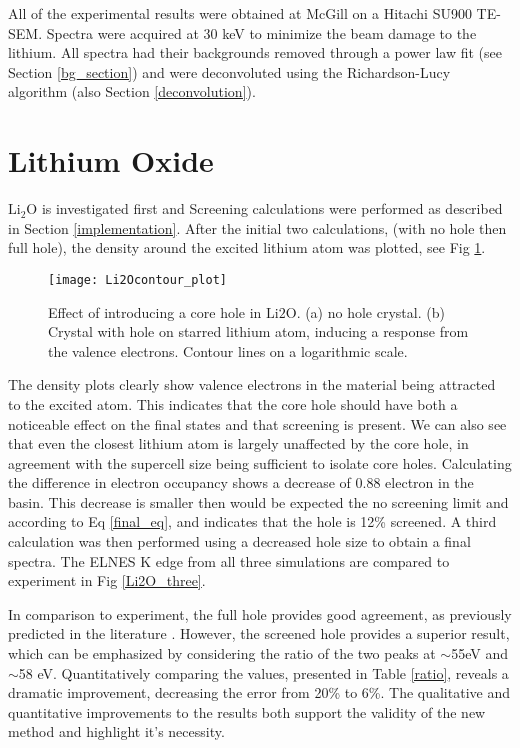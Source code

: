 All of the experimental results were obtained at McGill on a Hitachi SU900 TE-SEM.  Spectra were acquired at 30 keV to minimize the beam damage to the lithium.  All spectra had their backgrounds removed through a power law fit (see Section \ref{bg_section}) and were deconvoluted using the Richardson-Lucy algorithm (also Section \ref{deconvolution}).

\section{Lithium Oxide}

 $ \mathrm{Li_2O} $ is investigated first and Screening calculations were performed as described in Section \ref{implementation}.   After the initial two calculations, (with no hole then full hole), the density around the excited lithium atom was plotted, see Fig \ref{Li2O_contour}.  

\begin{figure}
	\centering
	\texttt{[image: Li2Ocontour\_plot]}
	\caption{Effect of introducing a core hole in $ \mathrm{Li2O} $.  (a) no hole crystal.  (b) Crystal with hole on starred lithium atom, inducing a response from the valence electrons.  Contour lines on a logarithmic scale. }
	\label{Li2O_contour}
\end{figure}

The density plots clearly show valence electrons in the material being attracted to the excited atom. This indicates that the core hole should have both a noticeable effect on the final states and that screening is present.  We can also see that even the closest lithium atom is largely unaffected by the core hole, in agreement with the supercell size being sufficient to isolate core holes.  Calculating the difference in electron occupancy shows a decrease of 0.88 electron in the basin.  This decrease is smaller then would be expected the no screening limit and according to Eq \ref{final_eq},  and indicates that the hole is 12\% screened.  A third calculation was then performed using a decreased hole size to obtain a final spectra.  The ELNES K edge from all three simulations are compared to experiment in Fig \ref{Li2O_three}.  

In comparison to experiment, the full hole provides good agreement, as previously predicted in the literature \cite{mauchamp_ab_2006}. However, the screened hole provides a superior result, which can be emphasized by considering the ratio of the two peaks at $\sim$55eV and $\sim$58 eV.  Quantitatively comparing the values, presented in Table \ref{ratio}, reveals a dramatic improvement, decreasing the error from 20\% to  6\%.  The qualitative and quantitative improvements to the results both support the validity of the new method and highlight it's necessity. 


